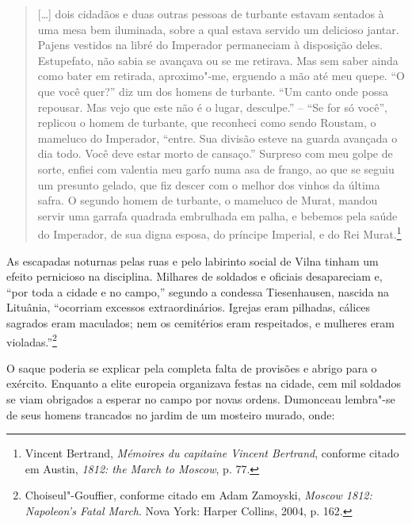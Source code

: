 \begin{quote}
[\ldots{}] dois cidadãos e duas outras pessoas de turbante estavam
sentados à uma mesa bem iluminada, sobre a qual estava servido um
delicioso jantar. Pajens vestidos na libré do Imperador permaneciam à
disposição deles. Estupefato, não sabia se avançava ou se me retirava.
Mas sem saber ainda como bater em retirada, aproximo"-me, erguendo a mão
até meu quepe. ``O que você quer?'' diz um dos homens de turbante. ``Um
canto onde possa repousar. Mas vejo que este não é o lugar, desculpe.'' --
``Se for só você'', replicou o homem de turbante, que reconheci como sendo
Roustam, o mameluco do Imperador, ``entre. Sua divisão esteve na guarda
avançada o dia todo. Você deve estar morto de cansaço.'' Surpreso com meu
golpe de sorte, enfiei com valentia meu garfo numa asa de frango, ao que
se seguiu um presunto gelado, que fiz descer com o melhor dos vinhos da
última safra. O segundo homem de turbante, o mameluco de Murat, mandou
servir uma garrafa quadrada embrulhada em palha, e bebemos pela saúde do
Imperador, de sua digna esposa, do príncipe Imperial, e do Rei
Murat.\footnote{Vincent Bertrand, \textit{Mémoires du capitaine Vincent Bertrand}, conforme citado em Austin, \textit{1812: the March to Moscow}, p. 77.} 
\end{quote}

As escapadas noturnas pelas ruas e pelo labirinto social de Vilna tinham
um efeito pernicioso na disciplina. Milhares de soldados e oficiais
desapareciam e, ``por toda a cidade e no campo,'' segundo a condessa
Tiesenhausen, nascida na Lituânia, ``ocorriam excessos extraordinários.
Igrejas eram pilhadas, cálices sagrados eram maculados; nem os
cemitérios eram respeitados, e mulheres eram violadas.''\footnote{Choiseul"-Gouffier, conforme citado em Adam Zamoyski, \textit{Moscow 1812: Napoleon's Fatal March}. Nova York: Harper Collins, 2004, p. 162.}

O saque poderia se explicar pela completa falta de provisões e abrigo
para o exército. Enquanto a elite europeia organizava festas na cidade,
cem mil soldados se viam obrigados a esperar no campo por novas ordens.
Dumonceau lembra"-se de seus homens trancados no jardim de um mosteiro
murado, onde:

